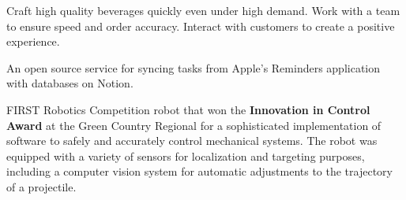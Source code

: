 \documentclass[10pt,a4paper,ragged2e,withhyper]{altacv}
\begin{document}
    
    \begin{paracol}{2}
    
        
    
    
    Craft high quality beverages quickly even under high demand. Work with a team to ensure speed and order accuracy. Interact with customers to create a positive experience.   \smallskip \smallskip
    \newline
      
    \newline
    
    
    \switchcolumn
    
     
    
    \bigskip
    \smallskip
    
       
      
       
      

    \switchcolumn

    An open source service for syncing tasks from Apple's Reminders application with databases on Notion.\smallskip \smallskip
    \newline
    \newline
    \divider
    
    FIRST Robotics Competition robot that won the {\bf Innovation in Control Award} at the Green Country Regional for a sophisticated implementation of software to safely and accurately control mechanical systems. The robot was equipped with a variety of sensors for localization and targeting purposes, including a computer vision system for automatic adjustments to the trajectory of a projectile.\smallskip \smallskip
    \newline
     
    \newline
    

\end{paracol}
\end{document}

